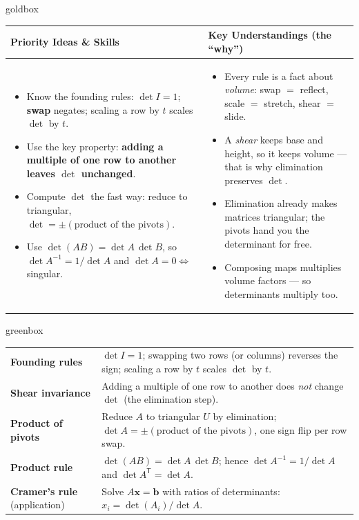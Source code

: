 \documentclass[10pt]{article}
\newcommand{\bb}{\mathbf{b}}
\newcommand{\xx}{\mathbf{x}}
\newcommand{\T}{\mathsf{T}}
\begin{document}
\renewcommand{\arraystretch}{1.4}
\begin{skillbox}{goldbox}
\begin{tabularx}{\linewidth}{@{}X|X@{}}
\textbf{Priority Ideas \& Skills} & \textbf{Key Understandings (the ``why'')} \\[2pt]
\hline
\vspace{-6pt}
\begin{itemize}[leftmargin=1.1em, nosep, after=\vspace{2pt}]
  \item Know the founding rules: $\det I=1$; \textbf{swap} negates; scaling a row by $t$ scales $\det$ by $t$.
  \item Use the key property: \textbf{adding a multiple of one row to another leaves $\det$ unchanged}.
  \item Compute $\det$ the fast way: reduce to triangular, $\det=\pm(\text{product of the pivots})$.
  \item Use $\det(AB)=\det A\,\det B$, so $\det A^{-1}=1/\det A$ and $\det A=0\Leftrightarrow$ singular.
\end{itemize}
&
\vspace{-6pt}
\begin{itemize}[leftmargin=1.1em, nosep, after=\vspace{2pt}]
  \item Every rule is a fact about \emph{volume}: swap $=$ reflect, scale $=$ stretch, shear $=$ slide.
  \item A \emph{shear} keeps base and height, so it keeps volume --- that is why elimination preserves $\det$.
  \item Elimination already makes matrices triangular; the pivots hand you the determinant for free.
  \item Composing maps multiplies volume factors --- so determinants multiply too.
\end{itemize}
\end{tabularx}
\end{skillbox}

\begin{skillbox}{greenbox}
\renewcommand{\arraystretch}{1.3}
\begin{tabularx}{\linewidth}{@{}l X@{}}
\textbf{Founding rules} & $\det I=1$; swapping two rows (or columns) reverses the sign; scaling a row by $t$ scales $\det$ by $t$. \\
\textbf{Shear invariance} & Adding a multiple of one row to another does \emph{not} change $\det$ (the elimination step). \\
\textbf{Product of pivots} & Reduce $A$ to triangular $U$ by elimination; $\det A=\pm(\text{product of the pivots})$, one sign flip per row swap. \\
\textbf{Product rule} & $\det(AB)=\det A\,\det B$; hence $\det A^{-1}=1/\det A$ and $\det A^{\T}=\det A$. \\
\textbf{Cramer's rule} (application) & Solve $A\xx=\bb$ with ratios of determinants: $x_i=\det(A_i)/\det A$. \\
\end{tabularx}
\end{skillbox}
\end{document}
